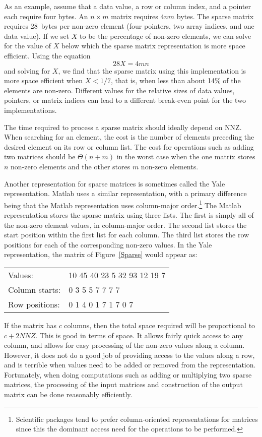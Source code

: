 As an example, assume that a data value, a row or
column index, and a pointer each require four bytes.
An $n \times m$ matrix requires $4nm$ bytes.
The sparse matrix requires 28~bytes per non-zero element
(four pointers, two array indices, and one data value).
If we set $X$ to be the percentage of non-zero elements, we can solve
for the value of $X$ below which the sparse matrix representation is
more space efficient.
Using the equation
\[ 28X = 4mn\]
\noindent and solving for $X$, we find that the sparse matrix using
this implementation is more space efficient when $X < 1/7$, that is,
when less than about 14\% of the elements are non-zero.
Different values for the relative sizes of data values, pointers, or
matrix indices can lead to a different break-even point
for the two implementations.

The time required to process a sparse matrix should ideally depend on
NNZ.
When searching for an element, the cost is the number of elements
preceding the desired element on its row or column list.
The cost for operations such as adding two matrices should be
$\Theta(n + m)$ in the worst case when the one matrix stores $n$
non-zero elements and the other stores $m$ non-zero elements.

Another representation for sparse matrices is sometimes called the
Yale representation.
Matlab uses a similar representation, with a primary difference being
that the Matlab representation uses column-major
order.\footnote{Scientific packages tend to prefer 
column-oriented representations for matrices since this the dominant
access need for the operations to be performed.}
The Matlab representation stores the sparse matrix using three lists.
The first is simply all of the non-zero element values, in
column-major order.
The second list stores the start position within the first list for
each column.
The third list stores the row positions for each of the
corresponding non-zero values.
In the Yale representation, the matrix of Figure~\ref{Sparse} would
appear as:

\medskip

\begin{tabular}{ll}
Values:& 10 45 40 23 5 32 93 12 19 7\\
Column starts:& 0 3 5 5 7 7 7 7\\
Row positions:& 0 1 4 0 1 7 1 7 0 7\\
\end{tabular}

\medskip

\noindent If the matrix has $c$ columns,
then the total space required will be proportional to $c + 2 NNZ$.
This is good in terms of space.
It allows fairly quick access to any column, and allows for easy
processing of the non-zero values along a column.
However, it does not do a good job of providing access to the values
along a row, and is terrible when values need to be added or
removed from the representation.
Fortunately, when doing computations such as adding or multiplying two
sparse matrices, the processing of the input matrices and construction
of the output matrix can be done reasonably efficiently.

